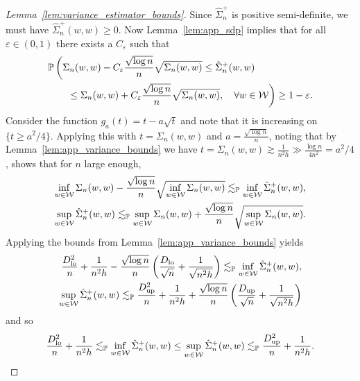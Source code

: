 \begin{proof}[Lemma~\ref{lem:variance_estimator_bounds}]

  Since $\hat \Sigma_n^+$ is positive semi-definite,
  we must have $\hat \Sigma_n^+(w,w) \geq 0$.
  Now Lemma~\ref{lem:app_sdp}
  implies that for all $\varepsilon \in (0,1)$
  there exists a $C_\varepsilon$ such that
  \begin{align*}
    &\mathbb{P}\left(
      \Sigma_n(w,w) - C_\varepsilon \frac{\sqrt{\log n}}{n} \sqrt{\Sigma_n(w,w)}
      \leq
      \hat \Sigma_n^+(w,w)
      \right.
      \\
      &\left.
      \qquad\leq
      \Sigma_n(w,w) + C_\varepsilon \frac{\sqrt{\log n}}{n}
      \sqrt{\Sigma_n(w,w)},
      \quad \forall w \in \mathcal{W}
    \right)
    \geq 1-\varepsilon.
  \end{align*}
  Consider the function
  $g_a(t) = t - a \sqrt{t}$
  and note that it is increasing on $\{t \geq a^2/4\}$.
  Applying this with $t = \Sigma_n(w,w)$
  and $a = \frac{\sqrt{\log n}}{n}$,
  noting that by Lemma~\ref{lem:app_variance_bounds} we have
  $t = \Sigma_n(w,w) \gtrsim \frac{1}{n^2h}
  \gg \frac{\log n}{4n^2} = a^2/4$,
  shows that for $n$ large enough,
  \begin{align*}
    \inf_{w \in \mathcal{W}} \Sigma_n(w,w)
    - \frac{\sqrt{\log n}}{n} \sqrt{\inf_{w \in \mathcal{W}} \Sigma_n(w,w)}
    \lesssim_{\mathbb{P}}
    \inf_{w \in \mathcal{W}}\hat \Sigma_n^+(w,w), \\
    \sup_{w \in \mathcal{W}}\hat \Sigma_n^+(w,w)
    \lesssim_{\mathbb{P}}
    \sup_{w \in \mathcal{W}} \Sigma_n(w,w)
    + \frac{\sqrt{\log n}}{n} \sqrt{\sup_{w \in \mathcal{W}} \Sigma_n(w,w)}.
  \end{align*}
  Applying the bounds from Lemma~\ref{lem:app_variance_bounds}
  yields
  \begin{align*}
    \frac{D_{\textup{lo}}^2}{n} + \frac{1}{n^2h}
    - \frac{\sqrt{\log n}}{n}
    \left( \frac{D_{\textup{lo}}}{\sqrt n} + \frac{1}{\sqrt{n^2h}} \right)
    \lesssim_{\mathbb{P}}
    \inf_{w \in \mathcal{W}}\hat \Sigma_n^+(w,w), \\
    \sup_{w \in \mathcal{W}}\hat \Sigma_n^+(w,w)
    \lesssim_{\mathbb{P}}
    \frac{D_{\textup{up}}^2}{n} + \frac{1}{n^2h}
    + \frac{\sqrt{\log n}}{n}
    \left( \frac{D_{\textup{up}}}{\sqrt n} + \frac{1}{\sqrt{n^2h}} \right)
  \end{align*}
  and so
  \begin{align*}
    \frac{D_{\textup{lo}}^2}{n} + \frac{1}{n^2h}
    \lesssim_{\mathbb{P}}
    \inf_{w \in \mathcal{W}}\hat \Sigma_n^+(w,w)
    \leq
    \sup_{w \in \mathcal{W}}\hat \Sigma_n^+(w,w)
    \lesssim_{\mathbb{P}}
    \frac{D_{\textup{up}}^2}{n} + \frac{1}{n^2h}.
  \end{align*}
\end{proof}

